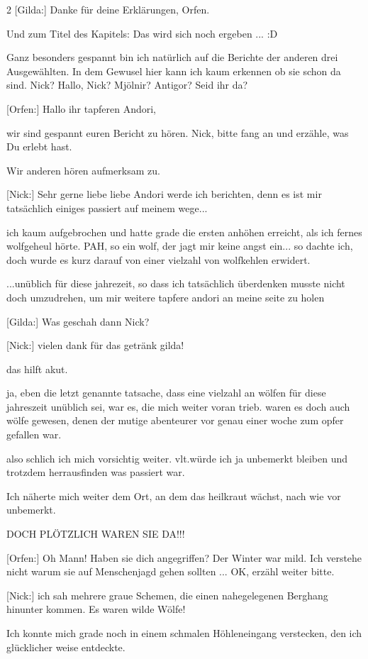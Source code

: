 \documentclass[10pt, a4paper, oneside]{book}
\begin{document}
\begin{multicols}{2}
[Gilda:] Danke für deine Erklärungen, Orfen.

Und zum Titel des Kapitels: Das wird sich noch ergeben ... :D

Ganz besonders gespannt bin ich natürlich auf die Berichte der anderen drei Ausgewählten. In dem Gewusel hier kann ich kaum erkennen ob sie schon da sind. Nick? Hallo, Nick? Mjölnir? Antigor? Seid ihr da?

[Orfen:] Hallo ihr tapferen Andori,

wir sind gespannt euren Bericht zu hören. Nick, bitte fang an und erzähle, was Du erlebt hast.

Wir anderen hören aufmerksam zu.

[Nick:] Sehr gerne liebe liebe Andori werde ich berichten, denn es ist mir tatsächlich einiges passiert auf meinem wege...

ich kaum aufgebrochen und hatte grade die ersten anhöhen erreicht, als ich fernes wolfgeheul hörte. PAH, so ein wolf, der jagt mir keine angst ein... so dachte ich, doch wurde es kurz darauf von einer vielzahl von wolfkehlen erwidert.

...unüblich für diese jahrezeit, so dass ich tatsächlich überdenken musste nicht doch umzudrehen, um mir weitere tapfere andori an meine seite zu holen

[Gilda:] Was geschah dann Nick?

[Nick:] vielen dank für das getränk gilda!

das hilft akut.

ja, eben die letzt genannte tatsache, dass eine vielzahl an wölfen für diese jahreszeit unüblich sei, war es, die mich weiter voran trieb. waren es doch auch wölfe gewesen, denen der mutige abenteurer vor genau einer woche zum opfer gefallen war.

also schlich ich mich vorsichtig weiter. vlt.würde ich ja unbemerkt bleiben und trotzdem herrausfinden was passiert war.

Ich näherte mich weiter dem Ort, an dem das heilkraut wächst, nach wie vor unbemerkt.

DOCH PLÖTZLICH WAREN SIE DA!!!

[Orfen:] Oh Mann! Haben sie dich angegriffen? Der Winter war mild. Ich verstehe nicht warum sie auf Menschenjagd gehen sollten ... OK, erzähl weiter bitte.

[Nick:] ich sah mehrere graue Schemen, die einen nahegelegenen Berghang hinunter kommen. Es waren wilde Wölfe!

Ich konnte mich grade noch in einem schmalen Höhleneingang verstecken, den ich glücklicher weise entdeckte.


\end{multicols}
\end{document}
